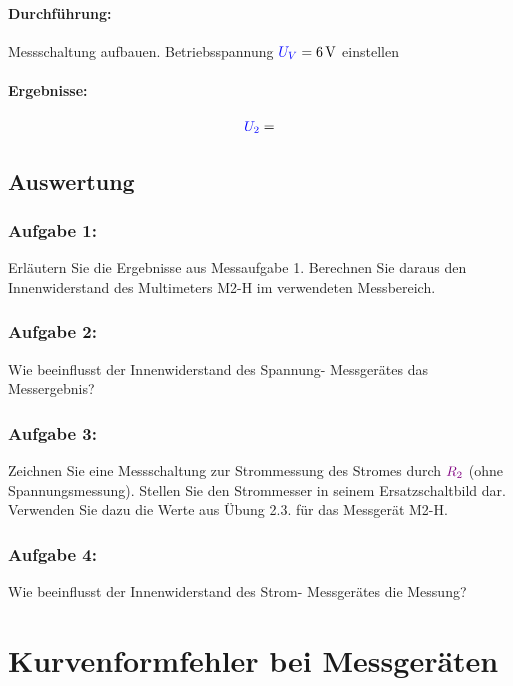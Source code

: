 \documentclass[11pt,a4paper,titlepage,parskip=half]{scrreprt}
\begin{document}
            \paragraph{Durchführung:} Messschaltung aufbauen. Betriebsspannung $\textcolor{blue}{U_V} = \SI{6}{\volt}$ einstellen
            \paragraph{Ergebnisse:}
                \begin{align*}
                    \textcolor{blue}{U_2} = 
                \end{align*}
           
            
            \subsection{Auswertung}
            \subsubsection{Aufgabe 1:}  Erläutern Sie die Ergebnisse aus Messaufgabe 1. Berechnen Sie daraus den Innenwiderstand des Multimeters M2-H im verwendeten Messbereich.
               
            \subsubsection{Aufgabe 2:}  Wie beeinflusst der Innenwiderstand des Spannung- Messgerätes das Messergebnis?
            
               
            \subsubsection{Aufgabe 3:} Zeichnen Sie eine Messschaltung zur Strommessung des Stromes durch $\textcolor{violet}{R_2}$ (ohne Spannungsmessung). Stellen Sie den Strommesser in seinem Ersatzschaltbild dar. Verwenden Sie dazu die Werte aus Übung 2.3. für das Messgerät M2-H.
             \
            \subsubsection{Aufgabe 4:} Wie beeinflusst der Innenwiderstand des Strom- Messgerätes die Messung?
            
             
        \section{Kurvenformfehler bei Messgeräten}
        
\end{document}
